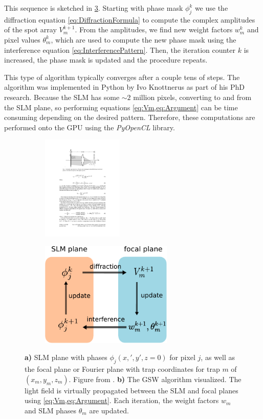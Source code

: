 This sequence is sketched in \cref{fig:GerschbergSaxton}. 
Starting with phase mask $\phi_j^k$ we use the diffraction equation \cref{eq:DiffractionFormula} to compute the complex amplitudes of the spot array $V_m^{k+1}$. 
From the amplitudes, we find new weight factors $w_m^k$ and pixel values $\theta_m^k$, which are used to compute the new phase mask using the interference equation \cref{eq:InterferencePattern}.
Then, the iteration counter $k$ is increased, the phase mask is updated and the procedure repeats. 

This type of algorithm typically converges after a couple tens of steps. The algorithm was implemented in Python by Ivo Knottnerus as part of his PhD research.
Because the SLM has some $\sim 2$ million pixels, converting to and from the SLM plane, so performing equations \cref{eq:Vm,eq:Argument} can be time consuming depending on the desired pattern.
Therefore, these computations are performed onto the GPU using the \textit{PyOpenCL} library. 

\begin{figure}
\centering
	\begin{subfigure}{.56\textwidth}
		\centering
		\includegraphics[height=5cm]{figures/SLMgeometry.pdf}
		\caption{}
		\label{fig:SLMgeometry}
	\end{subfigure}
	\begin{subfigure}{.43\textwidth}
		\centering
		\includegraphics[height=5cm]{figures/WeightedGerschbergSaxton.pdf}
		\caption{}
		\label{fig:MOTconcept}
	\end{subfigure}
	\caption{\textbf{a)} SLM plane with phases $\phi_j(x,',y',z=0)$ for pixel $j$, as well as the focal plane or Fourier plane with trap coordinates for trap $m$ of $(x_m,y_m,z_m)$. 
	Figure from \cite{DiLeonardo2007}. 
	\textbf{b)} The \ac{GSW} algorithm visualized.
	The light field is virtually propagated between the SLM and focal planes using \cref{eq:Vm,eq:Argument}. 
	Each iteration, the weight factors $w_m$ and SLM phases $\theta_m$ are updated. }
	\label{fig:GerschbergSaxton}
\end{figure}


